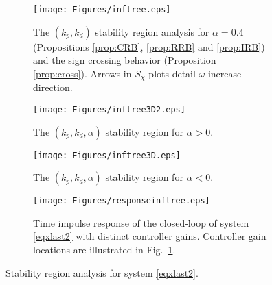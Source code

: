 \documentclass[twoside,reqno,11pt]{fcaa-var} %
\begin{document}
\begin{figure}%
	\centering %
	\begin{subfigure}[b]{0.48\columnwidth}
		\centering
		\texttt{[image: Figures/inftree.eps]}
		\caption{The $(k_p,k_d)$ stability region analysis for $\alpha=0.4$ (Propositions \ref{prop:CRB}, \ref{prop:RRB} and \ref{prop:IRB}) and  the sign crossing behavior (Proposition \ref{prop:cross}). Arrows in $S_\chi$ plots detail $\omega$ increase direction.}\label{inftreeregiona}
	\end{subfigure}
	\hfill
	\begin{subfigure}[b]{0.48\columnwidth}
		\centering
		\texttt{[image: Figures/inftree3D2.eps]}
		\caption{The $(k_p,k_d,\alpha)$ stability region for $\alpha>0$.}
		\label{inftreeregionc}
	\end{subfigure}
	\hfill
	
	\begin{subfigure}[b]{0.48\columnwidth}
		\centering
		\texttt{[image: Figures/inftree3D.eps]}
		\caption{The $(k_p,k_d,\alpha)$ stability region for $\alpha<0$.}
		\label{inftreeregionb}
	\end{subfigure}
	\hfill
	\begin{subfigure}[b]{0.48\columnwidth}
		\centering
		\texttt{[image: Figures/responseinftree.eps]}
		\caption{Time impulse response of the closed-loop of system \eqref{eqxlast2} with distinct controller gains. Controller gain locations are illustrated in Fig.~\ref{inftreeregiona}.}
		\label{Responseinftr}
	\end{subfigure}
	\caption{Stability region analysis for system \eqref{eqxlast2}.}\label{inftreeregion}
\end{figure}
\end{document}
